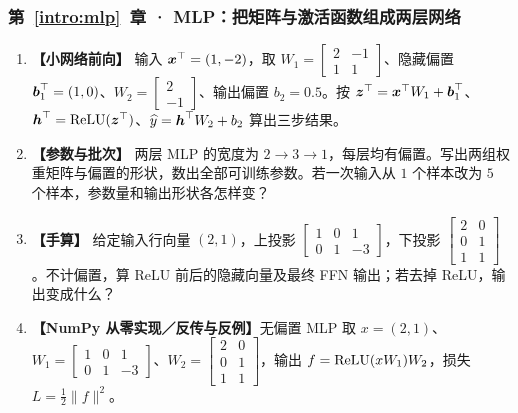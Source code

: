 \subsubsection*{第~\ref*{intro:mlp}~章 · MLP：把矩阵与激活函数组成两层网络}
\begin{enumerate}[label={},leftmargin=4.8em,itemsep=4pt]
\item[\textbf{C-034.}] \leavevmode{}\label{exercise:C-034}\label{exercise:mlp-activation-forward}\textbf{【小网络前向】} 输入 $\boldsymbol{x}^\top=(1,-2)$，取 $W_1=\begin{bmatrix}2&-1\\1&1\end{bmatrix}$、隐藏偏置 $\boldsymbol{b}_1^\top=(1,0)$、$W_2=\begin{bmatrix}2\\-1\end{bmatrix}$、输出偏置 $b_2=0.5$。按 $\boldsymbol{z}^\top=\boldsymbol{x}^\top W_1+\boldsymbol{b}_1^\top$、$\boldsymbol{h}^\top=\operatorname{ReLU}(\boldsymbol{z}^\top)$、$\widehat{y}=\boldsymbol{h}^\top W_2+b_2$ 算出三步结果。
\item[\textbf{C-035.}] \leavevmode{}\label{exercise:C-035}\label{exercise:mlp-parameter-count}\textbf{【参数与批次】} 两层 MLP 的宽度为 $2\to3\to1$，每层均有偏置。写出两组权重矩阵与偏置的形状，数出全部可训练参数。若一次输入从 $1$ 个样本改为 $5$ 个样本，参数量和输出形状各怎样变？
\item[\textbf{C-036.}] \leavevmode{}\label{exercise:C-036}\label{exercise:mlp-negative-activation}\textbf{【手算】} 给定输入行向量 $(2,1)$，上投影 $\begin{bmatrix}1&0&1\\0&1&-3\end{bmatrix}$，下投影 $\begin{bmatrix}2&0\\0&1\\1&1\end{bmatrix}$。不计偏置，算 ReLU 前后的隐藏向量及最终 FFN 输出；若去掉 ReLU，输出变成什么？
\item[\textbf{C-037.}] \leavevmode{}\label{exercise:C-037}\label{exercise:mlp-linear-composition}\textbf{【NumPy 从零实现／反传与反例】}无偏置 MLP 取 $x=(2,1)$、$W_1=\begin{bmatrix}1&0&1\\0&1&-3\end{bmatrix}$、$W_2=\begin{bmatrix}2&0\\0&1\\1&1\end{bmatrix}$，输出 $f=\operatorname{ReLU}(xW_1)W_2$，损失 $L=\tfrac12\|f\|^2$。

\end{enumerate}
